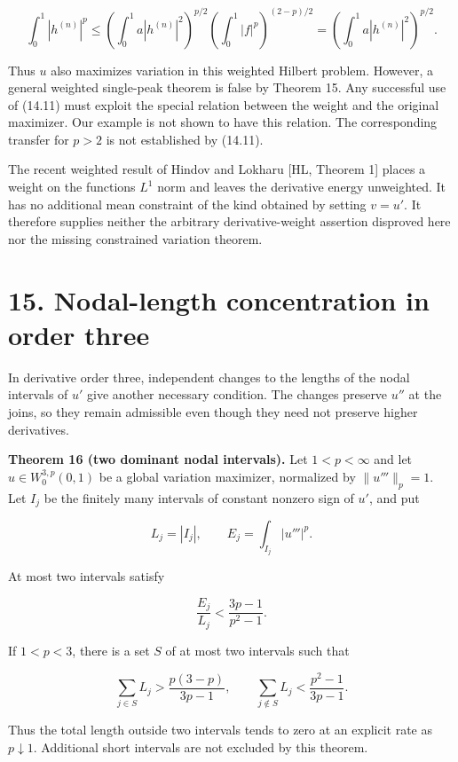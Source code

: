 \documentclass[11pt]{article}
\begin{document}
\[
\int_0^1|h^{(n)}|^p
\le\left(\int_0^1a|h^{(n)}|^2\right)^{p/2}
\left(\int_0^1|f|^p\right)^{(2-p)/2}
=\left(\int_0^1a|h^{(n)}|^2\right)^{p/2}.
\tag{14.11}
\]

Thus \(u\) also maximizes variation in this weighted Hilbert problem.
However, a general weighted single-peak theorem is false by Theorem 15.
Any successful use of (14.11) must exploit the special relation between
the weight and the original maximizer. Our example is not shown to have
this relation. The corresponding transfer for \(p>2\) is not established
by (14.11).

The recent weighted result of Hindov and Lokharu {[}HL, Theorem 1{]}
places a weight on the function\textquotesingle s \(L^1\) norm and
leaves the derivative energy unweighted. It has no additional mean
constraint of the kind obtained by setting \(v=u'\). It therefore
supplies neither the arbitrary derivative-weight assertion disproved
here nor the missing constrained variation theorem.

\section{15. Nodal-length concentration in order
three}\label{nodal-length-concentration-in-order-three}

In derivative order three, independent changes to the lengths of the
nodal intervals of \(u'\) give another necessary condition. The changes
preserve \(u''\) at the joins, so they remain admissible even though
they need not preserve higher derivatives.

\textbf{Theorem 16 (two dominant nodal intervals).} Let \(1<p<\infty\)
and let \(u\in W_0^{3,p}(0,1)\) be a global variation maximizer,
normalized by \(\|u'''\|_p=1\). Let \(I_j\) be the finitely many
intervals of constant nonzero sign of \(u'\), and put

\[
L_j=|I_j|,\qquad E_j=\int_{I_j}|u'''|^p.
\tag{15.1}
\]

At most two intervals satisfy

\[
\frac{E_j}{L_j}<\frac{3p-1}{p^2-1}.
\tag{15.2}
\]

If \(1<p<3\), there is a set \(S\) of at most two intervals such that

\[
\sum_{j\in S}L_j>\frac{p(3-p)}{3p-1},\qquad
\sum_{j\notin S}L_j<\frac{p^2-1}{3p-1}.
\tag{15.3}
\]

Thus the total length outside two intervals tends to zero at an explicit
rate as \(p\downarrow1\). Additional short intervals are not excluded by
this theorem.
\end{document}
